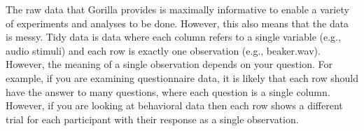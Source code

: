 The raw data that Gorilla provides is maximally informative to enable a variety of experiments and analyses to be done. However, this also means that the data is messy. Tidy data is data where each column refers to a single variable (e.g., audio stimuli) and each row is exactly one observation (e.g., beaker.wav). However, the meaning of a single observation depends on your question. For example, if you are examining questionnaire data, it is likely that each row should have the answer to many questions, where each question is a single column. However, if you are looking at behavioral data then each row shows a different trial for each participant with their response as a single observation.


